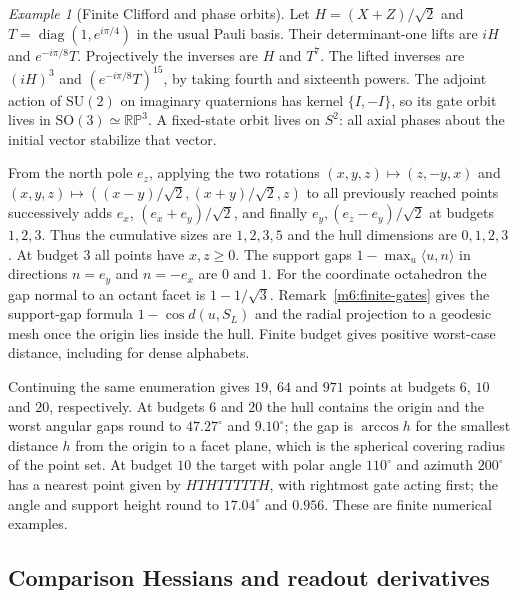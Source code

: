 \documentclass[11pt,reqno]{amsart}
\theoremstyle{definition}
\theoremstyle{remark}
\newtheorem{example}[theorem]{Example}
\numberwithin{equation}{section}
\begin{document}
\begin{example}[Finite Clifford and phase orbits]\label{m11:orbits}\sloppy
Let $H=(X+Z)/\sqrt2$ and $T=\operatorname{diag}(1,e^{i\pi/4})$ in
the usual Pauli basis. Their determinant-one lifts are $iH$ and
$e^{-i\pi/8}T$. Projectively the inverses are $H$ and $T^7$.
The lifted inverses are $(iH)^3$ and $(e^{-i\pi/8}T)^{15}$,
by taking fourth and sixteenth powers. The adjoint action of
$\mathrm{SU}(2)$ on imaginary quaternions has kernel $\{I,-I\}$,
so its gate orbit lives in $\mathrm{SO}(3)\simeq\mathbb{RP}^3$.
A fixed-state orbit lives on $S^2$: all axial phases about the
initial vector stabilize that vector.

From the north pole $e_z$, applying the two rotations
$(x,y,z)\mapsto(z,-y,x)$ and
$(x,y,z)\mapsto((x-y)/\sqrt2,(x+y)/\sqrt2,z)$ to all
previously reached points successively adds
$e_x$, $(e_x+e_y)/\sqrt2$, and finally
$e_y,(e_z-e_y)/\sqrt2$ at budgets $1,2,3$.
Thus the cumulative sizes are $1,2,3,5$ and the hull dimensions
are $0,1,2,3$. At budget $3$ all points have $x,z\ge0$. The support
gaps $1-\max_u\langle u,n\rangle$ in directions $n=e_y$ and $n=-e_x$ are
$0$ and $1$. For the coordinate octahedron the gap normal to an octant
facet is $1-1/\sqrt3$. Remark~\ref{m6:finite-gates} gives the support-gap
formula $1-\cos d(u,S_L)$ and the radial projection to a geodesic mesh
once the origin lies inside the hull. Finite budget gives positive
worst-case distance, including for dense alphabets.

Continuing the same enumeration gives $19$, $64$ and $971$ points
at budgets $6$, $10$ and $20$, respectively. At budgets $6$ and $20$
the hull contains the origin and the worst angular gaps round to
$47.27^\circ$ and $9.10^\circ$; the gap is $\arccos h$ for the smallest
distance $h$ from the origin to a facet plane, which is the spherical
covering radius of the point set.
At budget $10$ the target with polar angle $110^\circ$ and azimuth
$200^\circ$ has a nearest point given by $HTHTTTTTH$, with rightmost
gate acting first; the angle and support height round to $17.04^\circ$
and $0.956$. These are finite numerical examples.
\end{example}

\subsection{Comparison Hessians and readout derivatives}
\end{document}
